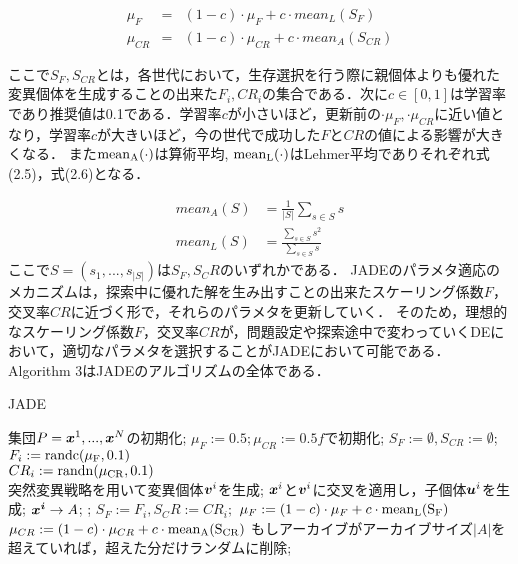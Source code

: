 \documentclass[a4paper,11pt,oneside,openany]{jsbook}
\def\vector#1{\mbox{\boldmath $#1$}}
\begin{document}
\begin{eqnarray}
  \mu_F & = & (1 - c)\cdot\mu_F + c\cdot mean_L(S_F)\\
  \mu_{CR} & = & (1 - c)\cdot\mu_{CR} + c\cdot mean_A(S_{CR})
\end{eqnarray}

ここで$S_F,S_{CR}$とは，各世代において，生存選択を行う際に親個体よりも優れた変異個体を生成することの出来た$F_i,CR_i$の集合である．次に$c\in[0,1]$は学習率であり推奨値は0.1である．学習率$c$が小さいほど，更新前の$\cdot\mu_F,\cdot\mu_{CR}$に近い値となり，学習率$c$が大きいほど，今の世代で成功した${F}$と${CR}$の値による影響が大きくなる．
また$\rm{mean}_A(\cdot)$は算術平均, $\rm{mean}_L(\cdot)$はLehmer平均でありそれぞれ式(2.5)，式(2.6)となる．

\begin{eqnarray}
  mean_A(S) & = \frac{1}{|S|}\sum_{s\in S}s \\
  mean_L(S) & = \frac{\sum_{s\in S}s^2}{\sum_{s\in S}s}
\end{eqnarray}
ここで$S=(s_1,..., s_{|S|})$は$S_F,S_CR$のいずれかである．
JADEのパラメタ適応のメカニズムは，探索中に優れた解を生み出すことの出来たスケーリング係数$F$，交叉率$CR$に近づく形で，それらのパラメタを更新していく．
そのため，理想的なスケーリング係数$F$，交叉率$CR$が，問題設定や探索途中で変わっていくDEにおいて，適切なパラメタを選択することがJADEにおいて可能である．
Algorithm 3はJADEのアルゴリズムの全体である．

\newpage
\begin{algorithm}
\caption{JADE}
\label{alg:pbnf}
\begin{algorithmic}
\STATE 集団$P={\vector{x}^1,...,\vector{x}^N}$の初期化;
\STATE  $\mu_F := 0.5; \mu_{CR} := 0.5f$で初期化;
    \STATE $S_F := \emptyset, S_{CR} := \emptyset$;
        \STATE $F_i := \rm{randc}(\mu _F, 0.1)$ \\
        \STATE $CR_i := \rm{randn}(\mu _{CR}, 0.1)$ \\
        \STATE 突然変異戦略を用いて変異個体{$\vector{v}^i$}を生成;
        \STATE $\vector{x}^i$と$\vector{v}^i$に交叉を適用し，子個体$\vector{u}^i$を生成;
    \ENDFOR
        \IF {$f(\vector{u}^i) \leqq f(\vector{x}^i)$}
            \STATE $\vector{x^i} \rightarrow {A}$;
            \STATE {$\vector{x}^i:=\vector{u}^i$};
            \STATE $S_F := {F_i}, S_CR := {CR_i};$
        \ENDIF
    \ENDFOR
        \STATE $\mu_F := (1 - c)\cdot\mu _F + c\cdot \rm{mean}_L(S_F)$
        \STATE $\mu_{CR} := (1 - c)\cdot\mu _{CR} + c\cdot  \rm{mean}_A(S_{CR})$
    \ENDIF
    \STATE もしアーカイブがアーカイブサイズ$|A|$を超えていれば，超えた分だけランダムに削除;
\ENDWHILE
\end{algorithmic}
\end{algorithm}
\newpage
\end{document}
